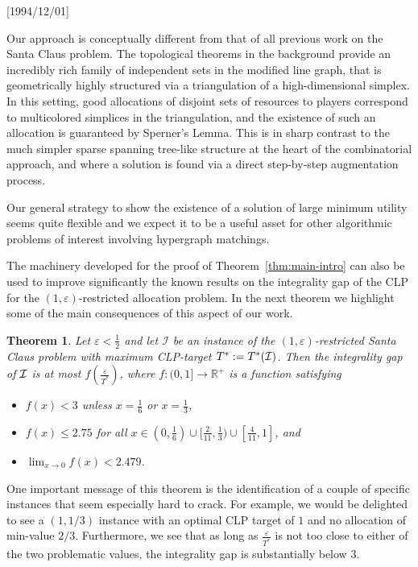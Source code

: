 \NeedsTeXFormat{LaTeX2e}[1994/12/01]\documentclass[letterpaper, 11pt]{article}
\newtheorem{thm}{Theorem}[section]
\theoremstyle{definition}
\theoremstyle{remark}
\numberwithin{equation}{section}
\begin{document}
Our approach is conceptually different from that of all previous work
on the Santa Claus problem. 
The topological theorems in the background provide an incredibly
rich family of independent sets in the modified line graph, that is 
geometrically highly structured via a triangulation of a
high-dimensional simplex. In this setting, good allocations of
disjoint sets of
resources to players correspond to multicolored simplices in the
triangulation, and the existence of such an allocation is guaranteed
by Sperner's Lemma. This is in sharp contrast to the much
simpler sparse spanning tree-like structure at the heart of the
combinatorial approach, and where a solution is found via a direct
step-by-step augmentation process.

Our general strategy to show the existence of a solution of
large minimum utility seems quite flexible and we expect it to
be a useful asset for other algorithmic
problems of interest involving hypergraph matchings.


The machinery developed for the proof of
Theorem~\ref{thm:main-intro} can also be
used to improve significantly the known results on the integrality
gap of the CLP for the $(1,\varepsilon)$-restricted allocation problem.
In the next theorem we highlight some of the main
consequences of this aspect of our work.

\begin{thm} \label{thm:smallepsilon}
Let $\varepsilon < \frac{1}{2}$ and let ${\mathcal I}$ be an instance of the 
$(1,\varepsilon)$-restricted Santa Claus problem with
maximum CLP-target $T^*:=T^*({\cal I})$.
Then the integrality gap of ${\cal I}$ is at most
$f(\frac{\varepsilon}{T^*})$, where 
$f:(0,1]\rightarrow \mathbb{R}^+$ is a function satisfying
  \begin{itemize}
  \item $f(x)<3$  unless $x=\frac16$ or $x=\frac13$,
  \item $f(x)\leq 2.75$ for all $x\in (0,\frac{1}{6}) \cup
    [\frac{2}{11}, \frac13) \cup [\frac{4}{11}, 1]$, 
    and
\item $\lim_{x\rightarrow 0}f(x) < 2.479$.
\end{itemize}
\end{thm}

One important message of this theorem is the identification 
of a couple of
specific instances that seem especially hard to crack. For example,
we would be delighted to see a $(1,1/3)$ instance with an optimal CLP
target of $1$ and no allocation of min-value $2/3$. Furthermore, we
see that as
long as $\frac{\varepsilon}{T^*}$ is not too close to either of the
two problematic values, the integrality gap is substantially below $3$. 
\end{document}
